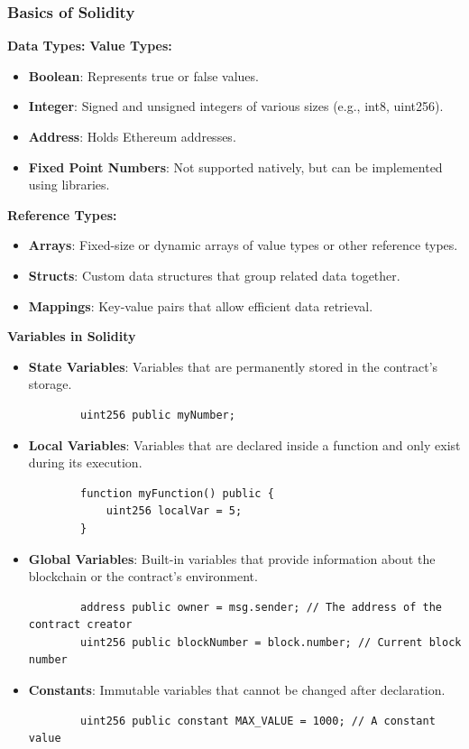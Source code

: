 \documentclass[12pt, a4paper]{article}
\begin{document}
\subsubsection{Basics of Solidity}
\textbf{Data Types:}
\textbf{Value Types:}
\begin{itemize}
    \item \textbf{Boolean}: Represents true or false values.
    \item \textbf{Integer}: Signed and unsigned integers of various sizes (e.g., int8, uint256).
    \item \textbf{Address}: Holds Ethereum addresses.
    \item \textbf{Fixed Point Numbers}: Not supported natively, but can be implemented using libraries.
\end{itemize}
\textbf{Reference Types:}
\begin{itemize}
    \item \textbf{Arrays}: Fixed-size or dynamic arrays of value types or other reference types.
    \item \textbf{Structs}: Custom data structures that group related data together.
    \item \textbf{Mappings}: Key-value pairs that allow efficient data retrieval.
\end{itemize}
\textbf{Variables in Solidity}
\begin{itemize}
    \item \textbf{State Variables}: Variables that are permanently stored in the contract's storage.
    \begin{verbatim}
        uint256 public myNumber;
    \end{verbatim}
    \item \textbf{Local Variables}: Variables that are declared inside a function and only exist during its execution.
    \begin{verbatim}
        function myFunction() public {
            uint256 localVar = 5;
        }
    \end{verbatim}
    \item \textbf{Global Variables}: Built-in variables that provide information about the blockchain or the contract's environment.
    \begin{verbatim}
        address public owner = msg.sender; // The address of the contract creator
        uint256 public blockNumber = block.number; // Current block number
    \end{verbatim}
    \item \textbf{Constants}: Immutable variables that cannot be changed after declaration.
    \begin{verbatim}
        uint256 public constant MAX_VALUE = 1000; // A constant value
    \end{verbatim}
\end{itemize}
\end{document}
